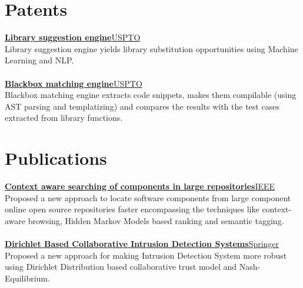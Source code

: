 \documentclass[margin,line]{resume}
\begin{document}
\begin{resume}
\section{\mysidestyle \bf Patents}
 {\bf\href{https://patents.google.com/patent/US10048945B1/}{Library suggestion engine}}\hfill \href{https://www.uspto.gov/}{USPTO} \\
Library suggestion engine yields library substitution opportunities using Machine Learning and NLP. \\\\
 {\bf\href{https://patents.google.com/patent/US10114624B1/}{Blackbox matching engine}}\hfill \href{https://www.uspto.gov/}{USPTO} \\
Blackbox matching engine extracts code snippets, makes them compilable (using AST parsing and templatizing) and compares the results with the test cases extracted from library functions.

\section{\mysidestyle \bf Publications}
 {\bf\href{http://ieeexplore.ieee.org/document/7148513/?arnumber=7148513}{Context aware searching of components in large repositories}}\hfill \href{https://www.ieee.org/}{IEEE} \\
Proposed a new approach to locate software components from large component online open source repositories faster encompassing the techniques like context-aware browsing, Hidden Markov Models based ranking and semantic tagging.\\\\
    {\bf\href{http://link.springer.com/chapter/10.1007/978-981-10-0251-9_32}{Dirichlet Based Collaborative Intrusion Detection Systems}}\hfill \href{https://www.springer.com}{Springer} \\
Proposed a new approach for making Intrusion Detection System more robust using Dirichlet Distribution based collaborative trust model and Nash-Equilibrium.
\pagebreak

\end{resume}
\end{document}
